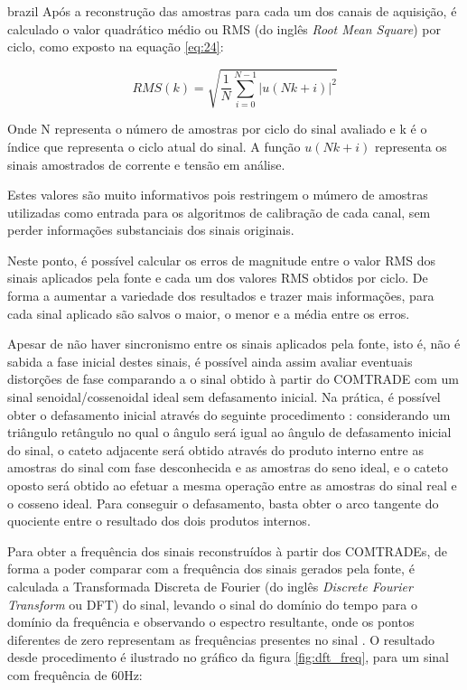 \begin{otherlanguage*}{brazil}
Após a reconstrução das amostras para cada um dos canais de aquisição, é calculado o valor quadrático médio ou RMS (do inglês \textit{Root Mean Square}) por ciclo, como exposto na equação \ref{eq:24}:

\begin{equation}\label{eq:24}
RMS(k) = \sqrt{\frac{1}{N} \sum_{i=0}^{N - 1} |u(Nk + i)|^2}
\end{equation} 

Onde N representa o número de amostras por ciclo do sinal avaliado e k é o índice que representa o ciclo atual do sinal. A função $u(Nk + i)$ representa os sinais amostrados de corrente e tensão em análise.

Estes valores são muito informativos pois restringem o múmero de amostras utilizadas como entrada para os algoritmos de calibração de cada canal, sem perder informações substanciais dos sinais originais. 

Neste ponto, é possível calcular os erros de magnitude entre o valor RMS dos sinais aplicados pela fonte e cada um dos valores RMS obtidos por ciclo. De forma a aumentar a variedade dos resultados e trazer mais informações, para cada sinal aplicado são salvos o maior, o menor e a média entre os erros. 

Apesar de não haver sincronismo entre os sinais aplicados pela fonte, isto é, não é sabida a fase inicial destes sinais, é possível ainda assim avaliar eventuais distorções de fase comparando a o sinal obtido à partir do COMTRADE com um sinal senoidal/cossenoidal ideal sem defasamento inicial. Na prática, é possível obter o defasamento inicial através do seguinte procedimento \cite{understandingdsp}: considerando um triângulo retângulo no qual o ângulo será igual ao ângulo de defasamento inicial do sinal, o cateto adjacente será obtido através do produto interno entre as amostras do sinal com fase desconhecida e as amostras do seno ideal, e o cateto oposto será obtido ao efetuar a mesma operação entre as amostras do sinal real e o cosseno ideal. Para conseguir o defasamento, basta obter o arco tangente do quociente entre o resultado dos dois produtos internos. 

Para obter a frequência dos sinais reconstruídos à partir dos COMTRADEs, de forma a poder comparar com a frequência dos sinais gerados pela fonte, é calculada a Transformada Discreta de Fourier (do inglês \textit{Discrete Fourier Transform} ou DFT) do sinal, levando o sinal do domínio do tempo para o domínio da frequência e observando o espectro resultante, onde os pontos diferentes de zero representam as frequências presentes no sinal \cite{lathisig}. O resultado desde procedimento é ilustrado no gráfico da figura \ref{fig:dft_freq}, para um sinal com frequência de 60Hz:


\end{otherlanguage*}
